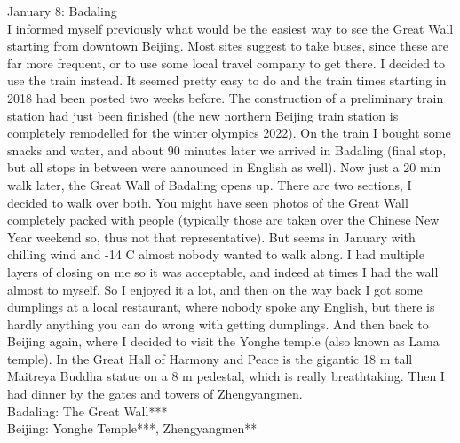 January 8: Badaling\\
I informed myself previously what would be the easiest way to see the Great Wall starting from downtown Beijing. Most sites suggest to take buses, since these are far more frequent, or to use some local travel company to get there. I decided to use the train instead. It seemed pretty easy to do and the train times starting in 2018 had been posted two weeks before. The construction of a preliminary train station had just been finished (the new northern Beijing train station is completely remodelled for the winter olympics 2022). On the train I bought some snacks and water, and about 90 minutes later we arrived in Badaling (final stop, but all stops in between were announced in English as well). Now just a 20 min walk later, the Great Wall of Badaling opens up. There are two sections, I decided to walk over both. You might have seen photos of the Great Wall completely packed with people (typically those are taken over the Chinese New Year weekend so, thus not that representative). But seems in January with chilling wind and -14 C almost nobody wanted to walk along. I had multiple layers of closing on me so it was acceptable, and indeed at times I had the wall almost to myself. So I enjoyed it a lot, and then on the way back I got some dumplings at a local restaurant, where nobody spoke any English, but there is hardly anything you can do wrong with getting dumplings. And then back to Beijing again, where I decided to visit the Yonghe temple (also known as Lama temple). In the Great Hall of Harmony and Peace is the gigantic 18 m tall Maitreya Buddha statue on a 8 m pedestal, which is really breathtaking. Then I had dinner by the gates and towers of Zhengyangmen.\\   

Badaling: The Great Wall***\\
Beijing: Yonghe Temple***, Zhengyangmen**\\

